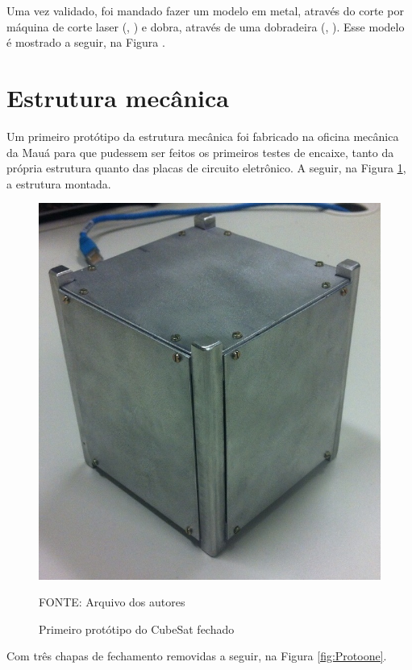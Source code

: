 \documentclass[
	12pt,				%
	openany,			%
	twoside,			%
	a4paper,			%
	english,			%
	french,				%
	spanish,			%
	brazil,				%
	oldfontcommands
	]{abntex2}
\begin{document}
\newpage

Uma vez validado, foi mandado fazer um modelo em metal, através do corte por máquina de corte laser (, ) e dobra, através de uma dobradeira (, ). Esse modelo é mostrado a seguir, na Figura .

%	

\section{Estrutura mecânica}

Um primeiro protótipo da estrutura mecânica foi fabricado na oficina mecânica da Mauá para que pudessem ser feitos os primeiros testes de encaixe, tanto da própria estrutura quanto das placas de circuito eletrônico. A seguir, na Figura \ref{fig:ProtooneF}, a estrutura montada.

\begin{figure}[ht]
	\caption{Primeiro protótipo do CubeSat fechado}
	\centering
	\includegraphics[width=0.5\linewidth]{./figs/PrototypeOne_Full}
	
	\begin{small}
		FONTE: Arquivo dos autores
	\end{small}
	\label{fig:ProtooneF}
\end{figure}

\newpage

Com três chapas de fechamento removidas a seguir, na Figura \ref{fig:Protoone}.

\end{document}
